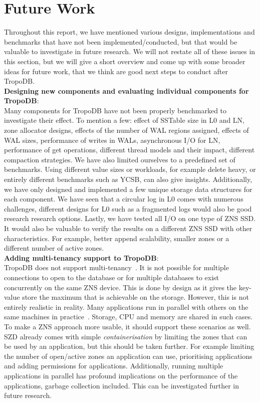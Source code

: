 \section{Future Work}
Throughout this report, we have mentioned various designs, implementations and benchmarks that have not been implemented/conducted, but that would be valuable to investigate in future research. We will not restate all of these issues in this section, but we will give a short overview and come up with some broader ideas for future work, that we think are good next steps to conduct after TropoDB.\\
\textbf{Designing new components and evaluating individual components for TropoDB}:\\
Many components for TropoDB have not been properly benchmarked to investigate their effect. To mention a few: effect of SSTable size in L0 and LN, zone allocator designs, effects of the number of WAL regions assigned, effects of WAL sizes, performance of writes in WALs, asynchronous I/O for LN, performance of get operations, different thread models and their impact, different compaction strategies. We have also limited ourselves to a predefined set of benchmarks. Using different value sizes or workloads, for example delete heavy, or entirely different benchmarks such as YCSB, can also give insights.
Additionally, we have only designed and implemented a few unique storage data structures for each component. We have seen that a circular log in L0 comes with numerous challenges, different designs for L0 such as a fragmented logs would also be good research research options. Lastly, we have tested all I/O on one type of ZNS SSD. It would also be valuable to verify the results on a different ZNS SSD with other characteristics. For example, better append scalability, smaller zones or a different number of active zones.\\
\textbf{Adding multi-tenancy support to TropoDB}:\\
TropoDB does not support multi-tenancy~\cite{kabbedijk2015defining}. It is not possible for multiple connections to open to the database or for multiple databases to exist concurrently on the same ZNS device. This is done by design as it gives the key-value store the maximum that is achievable on the storage. However, this is not entirely realistic in reality. Many applications run in parallel with others on the same machines in practice~\cite{aljahdali2014multi, bezemer2010multi}. Storage, CPU and memory are shared in such cases. To make a ZNS approach more usable, it should support these scenarios as well. SZD already comes with simple \textit{containerisation} by limiting the zones that can be used by an application, but this should be taken further. For example limiting the number of open/active zones an application can use, prioritising applications and adding permissions for applications. Additionally, running multiple applications in parallel has profound implications on the performance of the applications, garbage collection included. This can be investigated further in future research.\\
